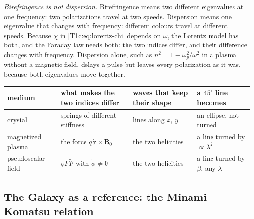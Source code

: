 \emph{Birefringence is not dispersion.} Birefringence means two different eigenvalues at one frequency: two polarizations travel at two speeds. Dispersion means one eigenvalue that changes with frequency: different colours travel at different speeds. Because $\chi$ in \eqref{T1c:eq:lorentz-chi} depends on $\omega$, the Lorentz model has both, and the Faraday law needs both: the two indices differ, and their difference changes with frequency. Dispersion alone, such as $n^2=1-\omega_p^2/\omega^2$ in a plasma without a magnetic field, delays a pulse but leaves every polarization as it was, because both eigenvalues move together.

\begin{center}
\small
\renewcommand{\arraystretch}{1.2}
\begin{tabularx}{\linewidth}{@{}>{\raggedright\arraybackslash}p{2.4cm}>{\raggedright\arraybackslash}X>{\raggedright\arraybackslash}p{2.6cm}>{\raggedright\arraybackslash}p{3.0cm}@{}}
\toprule
medium & what makes the two indices differ & waves that keep their shape & a $45^\circ$ line becomes\\\midrule
crystal & springs of different stiffness & lines along $x$, $y$ & an ellipse, not turned\\
magnetized plasma & the force $q\,\dot{\bm r}\times\bm B_0$ & the two helicities & a line turned by $\propto\lambda^2$\\
pseudoscalar field & $\phi F\tilde F$ with $\dot\phi\ne0$ & the two helicities & a line turned by $\beta$, any $\lambda$\\
\bottomrule
\end{tabularx}
\end{center}

\subsection{The Galaxy as a reference: the Minami--Komatsu relation}
\label{T1c:sec:mk}

